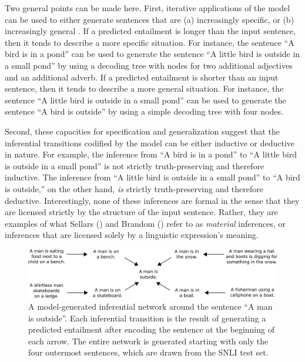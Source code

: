 Two general points can be made here. First, iterative applications of the model can be used to either generate sentences that are (a) increasingly specific, or (b) increasingly general \citep{Kolesnyk:2016}. If a predicted entailment is longer than the input sentence, then it tends to describe a more specific situation. For instance, the sentence ``A bird is in a pond'' can be used to generate the sentence ``A little bird is outside in a small pond'' by using a decoding tree with nodes for two additional adjectives and an additional adverb. If a predicted entailment is shorter than an input sentence, then it tends to describe a more general situation. For instance, the sentence ``A little bird is outside in a small pond'' can be used to generate the sentence ``A bird is outside'' by using a simple decoding tree with four nodes. 

Second, these capacities for specification and generalization suggest that the inferential transitions codified by the model can be either inductive or deductive in nature. For example, the inference from ``A bird is in a pond'' to ``A little bird is outside in a small pond'' is not strictly truth-preserving and therefore inductive. The inference from ``A little bird is outside in a small pond'' to ``A bird is outside,'' on the other hand, \textit{is} strictly truth-preserving and therefore deductive. Interestingly, none of these inferences are formal in the sense that they are licensed strictly by the structure of the input sentence. Rather, they are examples of what Sellars (\citeyear{Sellars:1953}) and Brandom (\citeyear{Brandom:1994}) refer to as \textit{material} inferences, or inferences that are licensed solely by a linguistic expression's meaning. 

\begin{figure}[t]
\begin{center}
\includegraphics[width=6in]{figures/chain.png}
\end{center}
\caption{A model-generated inferential network around the sentence ``A man is outside''. Each inferential transition is the result of generating a predicted entailment after encoding the sentence at the beginning of each arrow. The entire network is generated starting with only the four outermost sentences, which are drawn from the SNLI test set.} 
\label{chain}
\end{figure}

